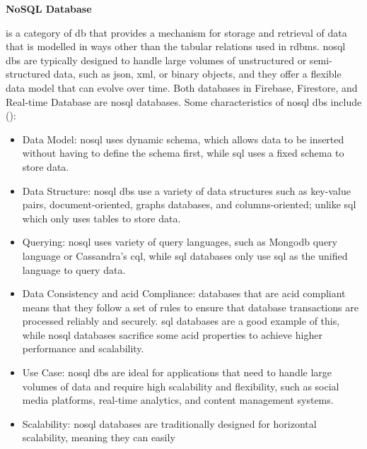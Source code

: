 \begin{multicols}{2}


      \textbf{NoSQL Database}

      is a category of \acrshort{db} that provides a mechanism for storage and retrieval of data that is modelled in ways other
      than the tabular relations used in \acrshort{rdbms}. \acrshort{nosql} \acrshort{db}s are typically designed to handle large
      volumes of unstructured or semi-structured data, such as \acrshort{json}, \acrshort{xml}, or binary objects, and they offer
      a flexible data model that can evolve over time. Both databases in Firebase, Firestore, and Real-time Database are \acrshort{nosql}
      databases. Some characteristics of \acrshort{nosql} \acrshort{db}s include (\cite{nosql}):
      \begin{itemize}
            \item Data Model: \acrshort{nosql} uses dynamic schema, which allows data to be inserted without having to define the schema
                  first, while \acrshort{sql} uses a fixed schema to store data.
            \item Data Structure: \acrshort{nosql} \acrshort{db}s use a variety of data structures such as key-value pairs,
                  document-oriented, graphs databases, and columns-oriented; unlike \acrshort{sql} which only uses tables to store data.
            \item Querying: \acrshort{nosql} uses variety of query languages, such as Mongo\acrshort{db} query language or Cassandra's
                  \acrshort{cql}, while \acrshort{sql} databases only use \acrshort{sql} as the unified language to query data.
            \item Data Consistency and \acrshort{acid} Compliance: databases that are \acrshort{acid} compliant means that they follow a
                  set of rules to ensure that database transactions are processed reliably and securely. \acrshort{sql} databases are a
                  good example of this, while \acrshort{nosql} databases sacrifice some \acrshort{acid} properties to achieve higher
                  performance and scalability.
            \item Use Case: \acrshort{nosql} \acrshort{db}s are ideal for applications that need to handle large volumes of data and
                  require high scalability and flexibility, such as social media platforms, real-time analytics, and content management
                  systems.
            \item Scalability: \acrshort{nosql} databases are traditionally designed for horizontal scalability, meaning they can easily

\end{itemize}
\end{multicols}

